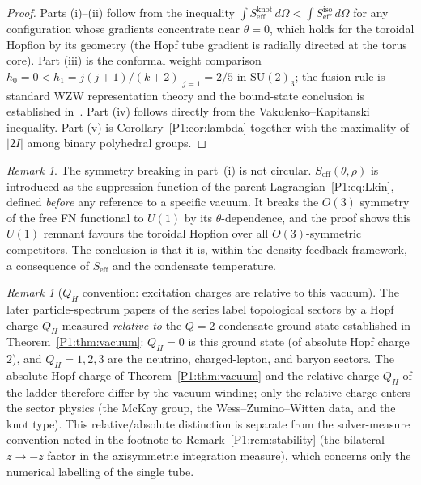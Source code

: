 \documentclass[11pt,a4paper]{article}
\theoremstyle{definition}
\theoremstyle{remark}
\newtheorem{remark}[theorem]{Remark}
\begin{document}
\begin{proof}
Parts (i)--(ii) follow from the inequality
$\int S_{\mathrm{eff}}^{\mathrm{knot}}\,d\Omega <
\int S_{\mathrm{eff}}^{\mathrm{iso}}\,d\Omega$
for any configuration whose gradients concentrate near $\theta=0$,
which holds for the toroidal Hopfion by its geometry (the Hopf tube
gradient is radially directed at the torus core).
Part (iii) is the conformal weight comparison
$h_0 = 0 < h_1 = j(j+1)/(k+2)|_{j=1} = 2/5$
in $\mathrm{SU}(2)_3$; the fusion rule is standard WZW representation
theory and the bound-state conclusion is established in~\cite{Paper2}.
Part (iv) follows directly from the Vakulenko--Kapitanski inequality.
Part (v) is Corollary~\ref{P1:cor:lambda} together with the maximality
of $|2I|$ among binary polyhedral groups.
\end{proof}

\begin{remark}
\label{P1:rem:symmetry_breaking_noncircular}
The symmetry breaking in part~(i) is not circular.
$S_{\mathrm{eff}}(\theta,\rho)$ is introduced as the suppression
function of the parent Lagrangian~\eqref{P1:eq:Lkin}, defined
\emph{before} any reference to a specific vacuum.  It breaks the
$O(3)$ symmetry of the free FN functional to $U(1)$ by its $\theta$-dependence,
and the proof shows this $U(1)$ remnant favours the toroidal Hopfion
over all $O(3)$-symmetric competitors.  The conclusion is that it is, within the
density-feedback framework, a consequence of $S_{\mathrm{eff}}$
and the condensate temperature.
\end{remark}

\begin{remark}[$Q_H$ convention: excitation charges are relative to this vacuum]
\label{P1:rem:qh_relative}
The later particle-spectrum papers of the series label topological sectors
by a Hopf charge $Q_H$ measured \emph{relative to} the $Q=2$ condensate
ground state established in Theorem~\ref{P1:thm:vacuum}: $Q_H=0$ is this
ground state (of absolute Hopf charge $2$), and $Q_H=1,2,3$ are the
neutrino, charged-lepton, and baryon sectors.  The absolute Hopf charge of
Theorem~\ref{P1:thm:vacuum} and the relative charge $Q_H$ of the ladder
therefore differ by the vacuum winding; only the relative charge enters the
sector physics (the McKay group, the Wess--Zumino--Witten data, and the
knot type).  This relative/absolute distinction is separate from the
solver-measure convention noted in the footnote to
Remark~\ref{P1:rem:stability} (the bilateral $z\to-z$ factor in the
axisymmetric integration measure), which concerns only the numerical
labelling of the single tube.
\end{remark}
\end{document}
